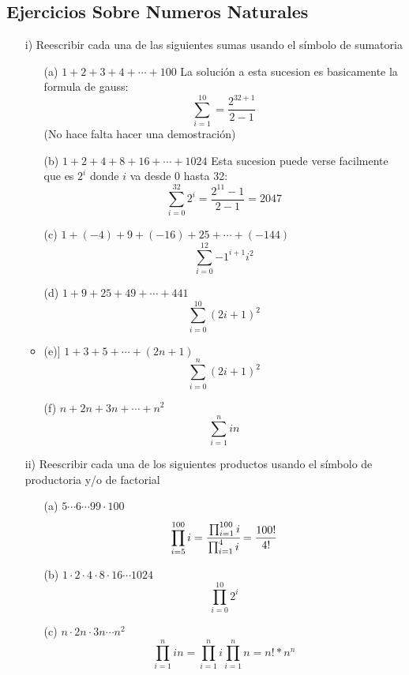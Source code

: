 \documentclass[10pt]{article}
\begin{document}
\subsection{Ejercicios Sobre Numeros Naturales}
\begin{ej}
\begin{itemize}
\item[i)] Reescribir cada una de las siguientes sumas usando el símbolo de sumatoria
\begin{itemize}
\item[(a)] $1 + 2 + 3 + 4 + \cdots + 100$
La solución a esta sucesion es basicamente la formula de gauss:
\[\sum_{i=1}^{10} = \frac{2^{32+1}}{2-1}\]
(No hace falta hacer una demostración)
\item[(b)] $1 + 2 + 4 + 8 + 16 + \cdots + 1024$
Esta sucesion puede verse facilmente que es $2^i$ donde $i$ va desde 0 hasta 32:
\[\sum_{i=0}^{32} 2^i = \frac{2^{11} - 1}{2 - 1} = 2047\]
\item[(c)] $1 + (-4) + 9 + (-16) + 25 + \cdots + (-144)$
\[\sum_{i=0}^{12} {-1}^{i+1} i^2 \]
\item[(d)] $1 + 9 + 25 + 49 + \cdots + 441$
\[\sum_{i=0}^{10} (2i +1)^2 \]
\item(e)] $1 + 3 + 5 + \cdots + (2n + 1)$
\[\sum_{i=0}^{n} (2i +1)^2 \]
\item[(f)] $n + 2n + 3n + \cdots + n^2$
\[\sum_{i=1}^{n} i  n \]
\end{itemize}

\item[ii)] Reescribir cada una de los siguientes productos usando el símbolo de productoria y/o de
factorial
\begin{itemize}
\item[(a)] $5 \cdots 6 \cdots 99 \cdot 100$
\[\prod_{i=5}^{100} i = \cfrac{\prod_{i=1}^{100} i}{\prod_{i=1}^{4} i} = \frac{100!}{4!}\]
\item[(b)] $1 \cdot 2 \cdot 4 \cdot 8 \cdot 16 \cdots 1024$
\[\prod_{i=0}^{10} 2^i \]
\item[(c)] $n \cdot 2n \cdot 3n \cdots n^2$
\[\prod_{i=1}^{n} i n = \prod_{i=1}^{n} i \prod_{i=1}^{n}  n = n! * n^n\]
\end{itemize}
\end{itemize}
\end{ej}
\end{document}
